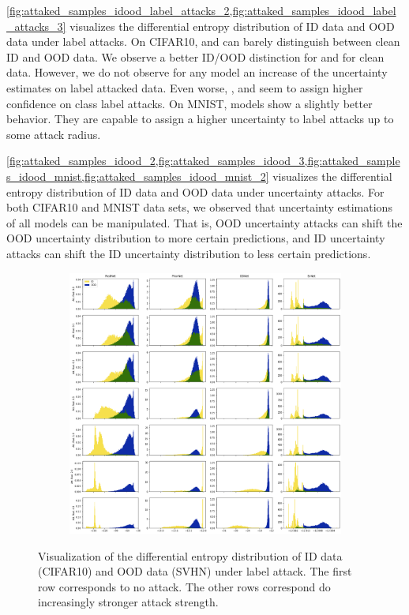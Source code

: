 \cref{fig:attaked_samples_idood_label_attacks_2,fig:attaked_samples_idood_label_attacks_3} visualizes the differential entropy distribution of ID data and OOD data under label attacks. On CIFAR10, \PriorNet and \DDNet can barely distinguish between clean ID and OOD data. We observe a better ID/OOD distinction for \PostNetacro{}  and \EvNet for clean data. However, we do not observe for any model an increase of the uncertainty estimates on label attacked data. Even worse, \PostNet, \PriorNet and \DDNet seem to assign higher confidence on class label attacks. On MNIST, models show a slightly better behavior. They are capable to assign a higher uncertainty to label attacks up to some attack radius.

\cref{fig:attaked_samples_idood_2,fig:attaked_samples_idood_3,fig:attaked_samples_idood_mnist,fig:attaked_samples_idood_mnist_2} visualizes the differential entropy distribution of ID data and OOD data under uncertainty attacks. For both CIFAR10 and MNIST data sets, we observed that uncertainty estimations of all models can be manipulated. That is, OOD uncertainty attacks can shift the OOD uncertainty distribution to more certain predictions, and ID uncertainty attacks can shift the ID uncertainty distribution to less certain predictions.


\begin{figure}[ht!]
    \centering
        \begin{subfigure}[t]{1.0\textwidth}
        \centering
        \includegraphics[width=0.99 \textwidth]{sections/008_icml2021/eval/unc_dist_label_id_cifar10_c.png}
    \end{subfigure}%
    \caption{Visualization of the differential entropy distribution of ID data (CIFAR10) and OOD data (SVHN) under label attack. The first row corresponds to no attack. The other rows correspond do increasingly stronger attack strength.}
    \label{fig:attaked_samples_idood_label_attacks_2}
	\vspace{-.5cm}
\end{figure}
\newpage

